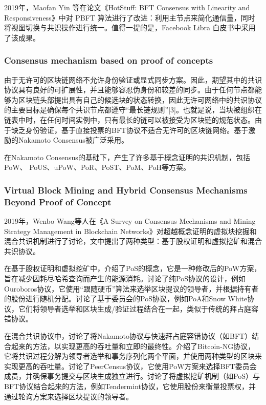 \documentclass[a4paper,twoside]{scrbook}
\begin{document}
\begin{CJK}{UTF8}{gbsn}
2019年，Maofan Yin 等在论文《HotStuff: BFT Consensus with Linearity and Responsiveness》\cite{yin2019hotstuff}中对 PBFT 算法进行了改进：利用主节点来简化通信量，同时将视图切换与共识操作进行统一。值得一提的是，Facebook Libra 白皮书中采用了该成果。

\subsubsection{Consensus mechanism based on proof of concepts}
由于无许可的区块链网络不允许身份验证或显式同步方案。因此，期望其中的共识协议具有良好的可扩展性，并且能够容忍伪身份和较差的同步。由于任何节点都能够为区块链头部提出具有自己的候选块的状态转换，因此无许可网络中的共识协议的主要目标是确保每个共识节点都遵守“最长链规则”[3]。也就是说，当块被组织在链表中时，在任何时间实例中，只有最长的链可以被接受为区块链的规范状态。由于缺乏身份验证，基于直接投票的BFT协议不适合无许可的区块链网络。基于激励的Nakamoto Consensus\cite{nakamoto2008bitcoin}被广泛采用。

在Nakamoto Consensus的基础下，产生了许多基于概念证明的共识机制，包括PoW、
PoUS、uPoW、PoR、PoST、PoM、PoH等方案。

\subsubsection{Virtual Block Mining and Hybrid Consensus Mechanisms Beyond Proof of Concept}
2019年，Wenbo Wang等人在《A Survey on Consensus Mechanisms and Mining Strategy Management in Blockchain Networks》\cite{wang2019survey}对超越概念证明的虚拟块挖掘和混合共识机制进行了讨论，文中提出了两种类型：基于股权证明和虚拟挖矿和混合共识协议。

在基于股权证明和虚拟挖矿中，介绍了PoS的概念，它是一种修改后的PoW方案，旨在减少因耗尽哈希查询而产生的能源消耗。讨论了纯PoS协议的设计，例如Ouroboros协议，它使用“跟随硬币”算法来选举区块提议的领导者，并根据持有者的股份进行随机分配。讨论了基于委员会的PoS协议，例如PoA和Snow White协议，它们将领导者选举和区块生成/验证过程结合在一起，类似于传统的拜占庭容错协议。

在混合共识协议中，讨论了将Nakamoto协议与快速拜占庭容错协议（如BFT）结合起来的方法，以实现更高的吞吐量和立即的最终性。介绍了Bitcoin-NG协议，它将共识过程分解为领导者选举和事务序列化两个平面，并使用两种类型的区块来实现更高的吞吐量。讨论了PeerCensus协议，它使用PoW方案来选择BFT委员会成员，并确保事务提交与区块生成独立进行。讨论了将虚拟挖矿机制（如PoS）与BFT协议结合起来的方法，例如Tendermint协议，它使用股份来衡量投票权，并通过轮询方案来选择区块提议的领导者。


\end{CJK}
\end{document}
